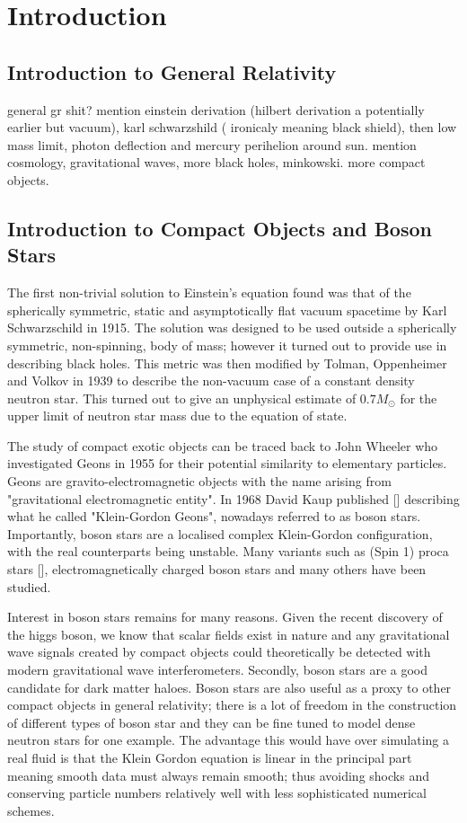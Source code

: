 

\section{Introduction}
\subsection{Introduction to General Relativity}
general gr shit?
mention einstein derivation (hilbert derivation a potentially earlier but vacuum), karl schwarzshild ( ironicaly meaning black shield), then low mass limit, photon deflection and mercury perihelion around sun. mention cosmology, gravitational waves, more black holes, minkowski. more compact objects. 

\subsection{Introduction to Compact Objects and Boson Stars}
The first non-trivial solution to Einstein's equation found was that of the spherically symmetric, static and asymptotically flat vacuum spacetime by Karl Schwarzschild in 1915. The solution was designed to be used outside a spherically symmetric, non-spinning, body of mass; however it turned out to provide use in describing black holes. This metric was then modified by Tolman, Oppenheimer and Volkov in 1939 to describe the non-vacuum case of a constant density neutron star. This turned out to give an unphysical estimate of $0.7 M_\odot$ for the upper limit of neutron star mass due to the equation of state. 

The study of compact exotic objects can be traced back to John Wheeler who investigated Geons in 1955 for their potential similarity to elementary particles. Geons are gravito-electromagnetic objects with the name arising from "gravitational electromagnetic entity". In 1968 David Kaup published [] describing what he called "Klein-Gordon Geons", nowadays referred to as boson stars. Importantly, boson stars are a localised complex Klein-Gordon configuration, with the real counterparts being unstable. Many variants such as (Spin 1) proca stars [], electromagnetically charged boson stars and many others have been studied. 

Interest in boson stars remains for many reasons. Given the recent discovery of the higgs boson, we know that scalar fields exist in nature and any gravitational wave signals created by compact objects could theoretically be detected with modern gravitational wave interferometers. Secondly, boson stars are a good candidate for dark matter haloes. Boson stars are also useful as a proxy to other compact objects in general relativity; there is a lot of freedom in the construction of different types of boson star and they can be fine tuned to model dense neutron stars for one example. The advantage this would have over simulating a real fluid is that the Klein Gordon equation is linear in the principal part meaning smooth data must always remain smooth; thus avoiding shocks and conserving particle numbers relatively well with less sophisticated numerical schemes. 

